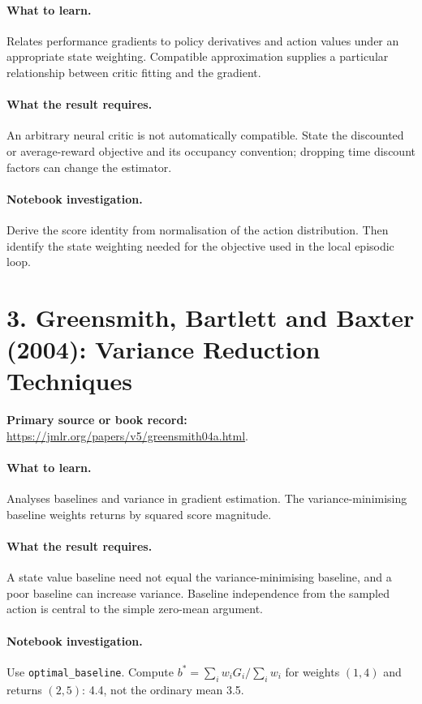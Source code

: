 \documentclass[11pt]{scrartcl}
\begin{document}
\paragraph{What to learn.} Relates performance gradients to policy derivatives and action values under an appropriate state weighting. Compatible approximation supplies a particular relationship between critic fitting and the gradient.

\paragraph{What the result requires.} An arbitrary neural critic is not automatically compatible. State the discounted or average-reward objective and its occupancy convention; dropping time discount factors can change the estimator.

\paragraph{Notebook investigation.} Derive the score identity from normalisation of the action distribution. Then identify the state weighting needed for the objective used in the local episodic loop.

\section*{3. Greensmith, Bartlett and Baxter (2004): Variance Reduction Techniques}
\textbf{Primary source or book record:} \url{https://jmlr.org/papers/v5/greensmith04a.html}.

\paragraph{What to learn.} Analyses baselines and variance in gradient estimation. The variance-minimising baseline weights returns by squared score magnitude.

\paragraph{What the result requires.} A state value baseline need not equal the variance-minimising baseline, and a poor baseline can increase variance. Baseline independence from the sampled action is central to the simple zero-mean argument.

\paragraph{Notebook investigation.} Use \texttt{optimal\_baseline}. Compute $b^*=\sum_i w_iG_i/\sum_iw_i$ for weights $(1,4)$ and returns $(2,5)$: 4.4, not the ordinary mean 3.5.
\end{document}
